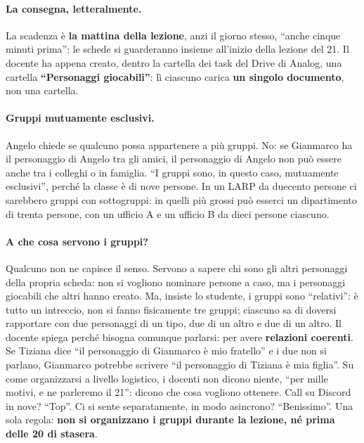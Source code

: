\paragraph{La consegna, letteralmente.} La scadenza è \textbf{la mattina della
lezione}, anzi il giorno stesso, ``anche cinque minuti prima'': le schede si
guarderanno insieme all'inizio della lezione del 21. Il docente ha appena creato,
dentro la cartella dei task del Drive di Analog, una cartella \textbf{``Personaggi
giocabili''}: lì ciascuno carica \textbf{un singolo documento}, non una cartella.

\paragraph{Gruppi mutuamente esclusivi.} Angelo chiede se qualcuno possa appartenere
a più gruppi. No: se Gianmarco ha il personaggio di Angelo tra gli amici, il
personaggio di Angelo non può essere anche tra i colleghi o in famiglia. ``I gruppi
sono, in questo caso, mutuamente esclusivi'', perché la classe è di nove persone. In
un LARP da duecento persone ci sarebbero gruppi con sottogruppi: in quelli più
grossi può esserci un dipartimento di trenta persone, con un ufficio A e un ufficio
B da dieci persone ciascuno.

\paragraph{A che cosa servono i gruppi?} Qualcuno non ne capisce il senso. Servono a
sapere chi sono gli altri personaggi della propria scheda: non si vogliono nominare
persone a caso, ma i personaggi giocabili che altri hanno creato. Ma, insiste lo
studente, i gruppi sono ``relativi'': è tutto un intreccio, non si fanno fisicamente
tre gruppi; ciascuno sa di doversi rapportare con due personaggi di un tipo, due di
un altro e due di un altro. Il docente spiega perché bisogna comunque parlarsi: per
avere \textbf{relazioni coerenti}. Se Tiziana dice ``il personaggio di Gianmarco è
mio fratello'' e i due non si parlano, Gianmarco potrebbe scrivere ``il personaggio
di Tiziana è mia figlia''. Su come organizzarsi a livello logistico, i docenti non
dicono niente, ``per mille motivi, e ne parleremo il 21'': dicono che cosa vogliono
ottenere. Call su Discord in nove? ``Top''. Ci si sente separatamente, in modo
asincrono? ``Benissimo''. Una sola regola: \textbf{non si organizzano i gruppi
durante la lezione, né prima delle 20 di stasera}.


